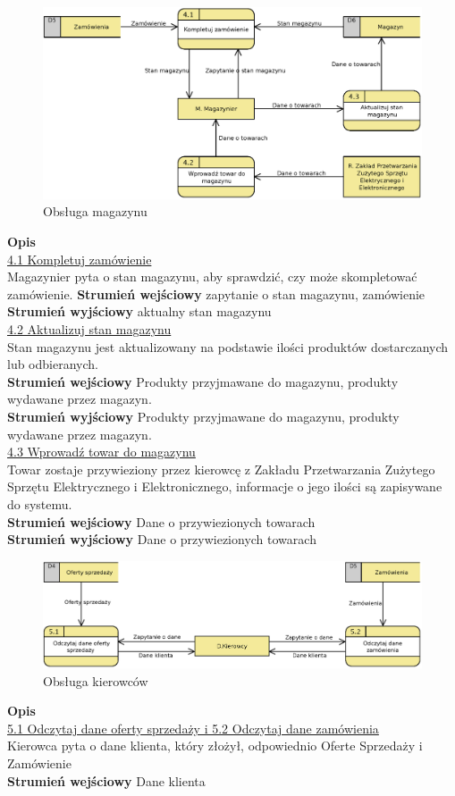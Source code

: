 	\begin{figure}[H]
		\centering
		\centerline{\includegraphics[width=1.1\textwidth]{img/DFD/2-level-magazyn.eps}}
		\caption{Obsługa magazynu}
	\end{figure}

	\textbf{Opis} \\
	\underline{4.1 Kompletuj zamówienie}\\
	Magazynier pyta o stan magazynu, aby sprawdzić, czy może skompletować zamówienie.
	\textbf{Strumień wejściowy} zapytanie o stan magazynu, zamówienie\\
	\textbf{Strumień wyjściowy} aktualny stan magazynu\\

	\underline{4.2 Aktualizuj stan magazynu}\\ 
	Stan magazynu jest aktualizowany na podstawie ilości produktów dostarczanych lub odbieranych.\\	
	\textbf{Strumień wejściowy} Produkty przyjmawane do magazynu, produkty wydawane przez magazyn.\\
	\textbf{Strumień wyjściowy} Produkty przyjmawane do magazynu, produkty wydawane przez magazyn.\\
	
	\underline{4.3 Wprowadź towar do magazynu}\\
	Towar zostaje przywieziony przez kierowcę z Zakładu Przetwarzania Zużytego Sprzętu Elektrycznego i Elektronicznego, informacje o jego ilości są zapisywane do systemu.\\
	\textbf{Strumień wejściowy} Dane o przywiezionych towarach\\
	\textbf{Strumień wyjściowy} Dane o przywiezionych towarach\\

	\begin{figure}[H]
		\centering
		\centerline{\includegraphics[width=1.1\textwidth]{img/DFD/2-level-kierowcy.eps}}
		\caption{Obsługa kierowców}
	\end{figure}
	
	\textbf{Opis} \\
	\underline{5.1 Odczytaj dane oferty sprzedaży i 5.2 Odczytaj dane zamówienia}\\
	Kierowca pyta o dane klienta, który złożył, odpowiednio Oferte Sprzedaży i Zamówienie\\
	\textbf{Strumień wejściowy} Dane klienta\\